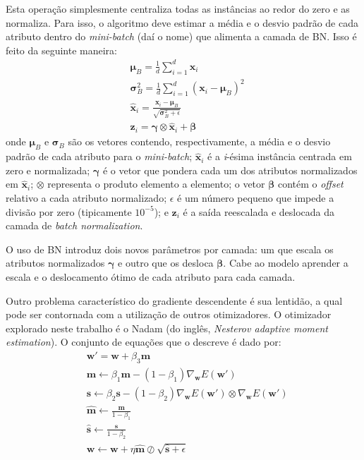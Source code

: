\documentclass[a4paper]{article}
\begin{document}
\begin{multicols}{2}
Esta operação simplesmente centraliza todas as instâncias ao redor do zero e as normaliza. Para isso, o algoritmo deve estimar a média e o desvio padrão de cada atributo dentro do \textit{mini-batch} (daí o nome) que alimenta a camada de BN. Isso é feito da seguinte maneira:
\begin{subequations}
\begin{align}
&\bm{\mu}_B = \frac{1}{d} \sum^{d}_{i=1} \mathbf{x}_i \label{eq:bn_1}\\
&\bm{\sigma}_B^2 = \frac{1}{d} \sum^{d}_{i=1} (\mathbf{x}_i - \bm{\mu}_B )^2 \label{eq:bn_2}\\
&\mathbf{\hat{x}}_i = \frac{\mathbf{x}_i - \bm{\mu}_B }{\sqrt{\bm{\sigma}_B^2 + \epsilon}} \label{eq:bn_3}\\ 
&\mathbf{z}_i = \bm{\gamma} \otimes \mathbf{\hat{x}}_i + \bm{\beta} \label{eq:bn_4}
\end{align}
\end{subequations}
onde $\bm{\mu}_B$ e $\bm{\sigma}_B$ são os vetores contendo, respectivamente, a média e o desvio padrão de cada atributo para o \textit{mini-batch}; $\mathbf{\hat{x}}_i$ é a \textit{i}-ésima instância centrada em zero e normalizada; $\bm{\gamma}$ é o vetor que pondera cada um dos atributos normalizados em $\mathbf{\hat{x}}_i$; $\otimes$ representa o produto elemento a elemento; o vetor $\bm{\beta}$ contém o \textit{offset} relativo a cada atributo normalizado; $\epsilon$ é um número pequeno que impede a divisão por zero (tipicamente $10^{-5}$); e $\mathbf{z}_i$ é a saída reescalada e deslocada da camada de \textit{batch normalization}.

O uso de BN introduz dois novos parâmetros por camada: um que escala os atributos normalizados $\bm{\gamma}$ e outro que os desloca $\bm{\beta}$. Cabe ao modelo aprender a escala e o deslocamento ótimo de cada atributo para cada camada.

Outro problema característico do gradiente descendente é sua lentidão, a qual pode ser contornada com a utilização de outros otimizadores. O otimizador explorado neste trabalho é o Nadam (do inglês, \emph{Nesterov adaptive moment estimation}). O conjunto de equações que o descreve é dado por:
\begin{subequations}
\begin{align}
&\mathbf{w}' = \mathbf{w} + \beta_3\mathbf{m} \label{eq:nadam_0} \\
&\mathbf{m} \gets \beta_1\mathbf{m} - (1-\beta_1) \nabla_{\mathbf{w}}E(\mathbf{w}') \label{eq:nadam_1}\\
&\mathbf{s} \gets \beta_2\mathbf{s} - (1-\beta_2) \nabla_{\mathbf{w}}E(\mathbf{w}') \otimes \nabla_{\mathbf{w}}E(\mathbf{w}') \label{eq:nadam_2}\\
&\mathbf{\hat{m}} \gets \frac{\mathbf{m}}{1 - \beta_1} \label{eq:nadam_3}\\ 
&\mathbf{\hat{s}} \gets \frac{\mathbf{s}}{1 - \beta_2} \label{eq:nadam_4} \\
&\mathbf{w} \gets \mathbf{w} + \eta \mathbf{\hat{m}} \oslash \sqrt{\mathbf{\hat{s}} + \epsilon} \label{eq:nadam_5}
\end{align}
\end{subequations}


\end{multicols}
\end{document}

